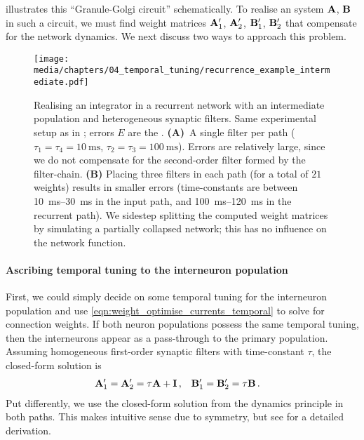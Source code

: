  illustrates this \enquote{Granule-Golgi circuit} schematically.
To realise an \LTI system $\mathbf{A}$, $\mathbf{B}$ in such a circuit, we must find weight matrices $\mathbf{A}_1'$, $\mathbf{A}_2'$, $\mathbf{B}_1'$, $\mathbf{B}_2'$ that compensate for the network dynamics.
We next discuss two ways to approach this problem.

\begin{figure}
	\texttt{[image: media/chapters/04\_temporal\_tuning/recurrence\_example\_intermediate.pdf]}
	\caption[Realising an integrator in a recurrent network with an intermediate population]{Realising an integrator in a recurrent network with an intermediate population and heterogeneous synaptic filters. Same experimental setup as in ; errors $E$ are the \NRMSE.
	\textbf{(A)}~A single filter per path ($\tau_1 = \tau_4 = \SI{10}{\milli\second}$, $\tau_2 = \tau_3 = \SI{100}{\milli\second}$).
	Errors are relatively large, since we do not compensate for the second-order filter formed by the filter-chain.
	\textbf{(B)} Placing three filters in each path (for a total of $21$ weights) results in smaller errors (time-constants are between \SIrange{10}{30}{\milli\second} in the input path, and \SIrange{100}{120}{\milli\second} in the recurrent path).
	We sidestep splitting the computed weight matrices by simulating a partially collapsed network; this has no influence on the network function.
	}
	\label{fig:recurrence_example_intermediate}
\end{figure}

\paragraph{Ascribing temporal tuning to the interneuron population}
First, we could simply decide on some temporal tuning for the interneuron population and use \cref{eqn:weight_optimise_currents_temporal} to solve for connection weights.
If both neuron populations possess the same temporal tuning, then the interneurons appear as a pass-through to the primary population.
Assuming homogeneous first-order synaptic filters with time-constant $\tau$, the closed-form solution is
\begin{align}
	\mathbf{A}_1' &= \mathbf{A}_2' = \tau \mathbf{A} + \mathbf{I} \,, & \mathbf{B}_1' &= \mathbf{B}_2' = \tau \mathbf{B} \,.
\end{align}
Put differently, we use the closed-form solution from the \NEF dynamics principle in both paths.
This makes intuitive sense due to symmetry, but see  for a detailed derivation.

